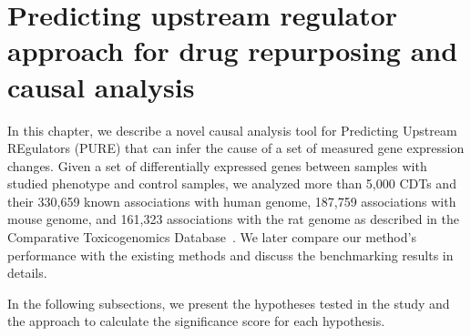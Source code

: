 \documentclass[Minh_PhD_thesis.tex]{subfiles}
\begin{document}
\section{Predicting upstream regulator approach for drug repurposing and causal analysis}



\label{chap:PURE}



In this chapter, we describe a novel causal analysis tool for Predicting Upstream REgulators (PURE) that can infer the cause of a set of measured gene expression changes. 
Given a set of differentially expressed genes between samples with studied phenotype and control samples, we  analyzed more  than 5,000 CDTs and their 330,659 known associations with human genome, 187,759 associations with mouse genome, and 161,323 associations with the rat genome as described in the Comparative Toxicogenomics Database~\cite{mattingly2006comparative}. We later compare our method's performance with the existing methods and discuss the benchmarking results in details.
 
 
In the following subsections, we present the hypotheses tested in the study and the approach to calculate the significance score for each hypothesis.

\end{document}
